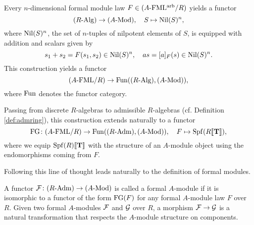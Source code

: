 \documentclass[../main.tex]{subfiles}
\begin{document}
Every $n$-dimensional formal module law $F \in {({A}\textnormal-\allowbreak\mathrm{FML^{arb}}/{R})}$
yields a functor
\begin{equation}\label{eq:fmnilpfunc}
  {({R}\textnormal-\allowbreak\mathrm{Alg})} \to {({A}\textnormal-\allowbreak\mathrm{Mod})}, \quad S \mapsto {\operatorname{Nil}}(S)^n,
\end{equation}
where ${\operatorname{Nil}}(S)^n$, the set of $n$-tuples of nilpotent elements of $S$, is
equipped with addition and scalars given by 
\begin{equation*}
  s_1 + s_2 = F(s_1, s_2) \in {\operatorname{Nil}}(S)^n, \quad a s = [a]_F(s) \in {\operatorname{Nil}}(S)^n.
\end{equation*}
This construction yields a functor 
\begin{equation}\label{eq:formfunc}
  {({A}\textnormal-\allowbreak\mathrm{FML}/{R})} \to \operatorname{Fun}({({R}\textnormal-\allowbreak\mathrm{Alg})}, {({A}\textnormal-\allowbreak\mathrm{Mod})}),
\end{equation}
where $\operatorname{Fun}$ denotes the functor category.

Passing from discrete $R$-algebras to admissible $R$-algebras (cf. Definition
\ref{def:admring}), this construction extends naturally to a functor 
\begin{equation*}
  \textnormal{FG} \colon {({A}\textnormal-\allowbreak\mathrm{FML}/{R})} \to \operatorname{Fun} ({({R}\textnormal-\allowbreak\mathrm{Adm})}, {({A}\textnormal-\allowbreak\mathrm{Mod})}), \quad F \mapsto \operatorname{Spf} (R\llbracket \mathbf{T} \rrbracket),
\end{equation*}
where we equip $\operatorname{Spf}(R) \llbracket \mathbf{T} \rrbracket$ with the structure of an $A$-module object
using the endomorphisms coming from $F$. 

Following this line of thought leads naturally to the definition of
formal modules. 

\begin{defi}
  A functor $\mathcal{F} \colon {({R}\textnormal-\allowbreak\mathrm{Adm})} \to {({A}\textnormal-\allowbreak\mathrm{Mod})}$ is called a formal $A$-module if it
  is isomorphic to a functor of the form $\textnormal{FG}(F)$ for
  any formal $A$-module law $F$ over $R$. Given two formal $A$-modules $\mathcal{F}$
  and $\mathcal{G}$ over $R$, a
  morphism $\mathcal{F} \to \mathcal{G}$ is a natural transformation that respects the 
  $A$-module structure on components.
\end{defi}

\end{document}
